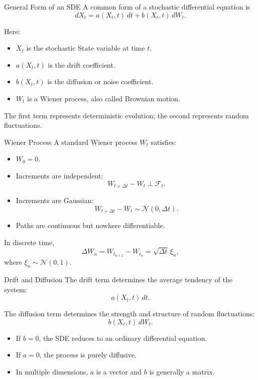 \documentclass[a4paper, 10pt, onepage]{elegantbook}
\begin{document}
{\begin{frame}{General Form of an SDE}
  A common form of a stochastic differential equation is
  \[
    dX_t
    =
    a(X_t,t)\,dt
    +
    b(X_t,t)\,dW_t.
  \]

  Here:
  \begin{itemize}
    \item \(X_t\) is the stochastic State variable at time \(t\).
    \item \(a(X_t,t)\) is the drift coefficient.
    \item \(b(X_t,t)\) is the diffusion or noise coefficient.
    \item \(W_t\) is a Wiener process, also called Brownian motion.
  \end{itemize}

  The first term represents deterministic evolution; the second represents random fluctuations.
\end{frame}

\begin{frame}{Wiener Process}
  A standard Wiener process \(W_t\) satisfies:
  \begin{itemize}
    \item \(W_0=0\).
    \item Increments are independent:
    \[
      W_{t+\Delta t}-W_t
      \perp
      \mathcal{F}_t.
    \]
    \item Increments are Gaussian:
    \[
      W_{t+\Delta t}-W_t
      \sim
      \mathcal{N}(0,\Delta t).
    \]
    \item Paths are continuous but nowhere differentiable.
  \end{itemize}

  In discrete time,
  \[
    \Delta W_n
    =
    W_{t_{n+1}}-W_{t_n}
    =
    \sqrt{\Delta t}\,\xi_n,
  \]
  where \(\xi_n\sim\mathcal{N}(0,1)\).
\end{frame}

\begin{frame}{Drift and Diffusion}
  The drift term determines the average tendency of the system:
  \[
    a(X_t,t)\,dt.
  \]

  The diffusion term determines the strength and structure of random fluctuations:
  \[
    b(X_t,t)\,dW_t.
  \]

  \begin{itemize}
    \item If \(b=0\), the SDE reduces to an ordinary differential equation.
    \item If \(a=0\), the process is purely diffusive.
    \item In multiple dimensions, \(a\) is a vector and \(b\) is generally a matrix.
  \end{itemize}
\end{frame}

}
\end{document}
